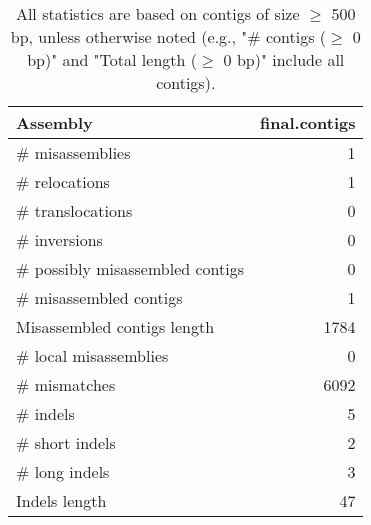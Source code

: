 \documentclass[12pt,a4paper]{article}
\begin{document}
\begin{table}[ht]
\begin{center}
\caption{All statistics are based on contigs of size $\geq$ 500 bp, unless otherwise noted (e.g., "\# contigs ($\geq$ 0 bp)" and "Total length ($\geq$ 0 bp)" include all contigs).}
\begin{tabular}{|l*{1}{|r}|}
\hline
Assembly & final.contigs \\ \hline
\# misassemblies & 1 \\ \hline
\hspace{5mm}\# relocations & 1 \\ \hline
\hspace{5mm}\# translocations & 0 \\ \hline
\hspace{5mm}\# inversions & 0 \\ \hline
\# possibly misassembled contigs & 0 \\ \hline
\# misassembled contigs & 1 \\ \hline
Misassembled contigs length & 1784 \\ \hline
\# local misassemblies & 0 \\ \hline
\# mismatches & 6092 \\ \hline
\# indels & 5 \\ \hline
\hspace{5mm}\# short indels & 2 \\ \hline
\hspace{5mm}\# long indels & 3 \\ \hline
Indels length & 47 \\ \hline
\end{tabular}
\end{center}
\end{table}
\end{document}
